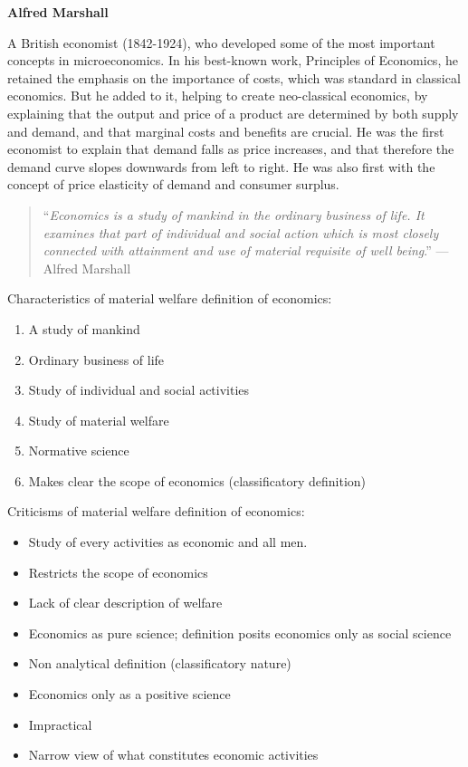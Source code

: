 \documentclass[11pt,]{book}
\providecommand{\tightlist}{%
  \setlength{\itemsep}{0pt}\setlength{\parskip}{0pt}}
\theoremstyle{definition}
\theoremstyle{definition}
\theoremstyle{definition}
\theoremstyle{remark}
\begin{document}
\textbf{Alfred Marshall}

A British economist (1842-1924), who developed some of the most
important concepts in microeconomics. In his best-known work, Principles
of Economics, he retained the emphasis on the importance of costs, which
was standard in classical economics. But he added to it, helping to
create neo-classical economics, by explaining that the output and price
of a product are determined by both supply and demand, and that marginal
costs and benefits are crucial. He was the first economist to explain
that demand falls as price increases, and that therefore the demand
curve slopes downwards from left to right. He was also first with the
concept of price elasticity of demand and consumer surplus.

\begin{quote}
``\emph{Economics is a study of mankind in the ordinary business of
life. It examines that part of individual and social action which is
most closely connected with attainment and use of material requisite of
well being}.'' --- Alfred Marshall
\end{quote}

Characteristics of material welfare definition of economics:

\begin{enumerate}
\def\labelenumi{\arabic{enumi}.}
\tightlist
\item
  A study of mankind
\item
  Ordinary business of life
\item
  Study of individual and social activities
\item
  Study of material welfare
\item
  Normative science
\item
  Makes clear the scope of economics (classificatory definition)
\end{enumerate}

Criticisms of material welfare definition of economics:

\begin{itemize}
\tightlist
\item
  Study of every activities as economic and all men.
\item
  Restricts the scope of economics
\item
  Lack of clear description of welfare
\item
  Economics as pure science; definition posits economics only as social
  science
\item
  Non analytical definition (classificatory nature)
\item
  Economics only as a positive science
\item
  Impractical
\item
  Narrow view of what constitutes economic activities
\end{itemize}
\end{document}
